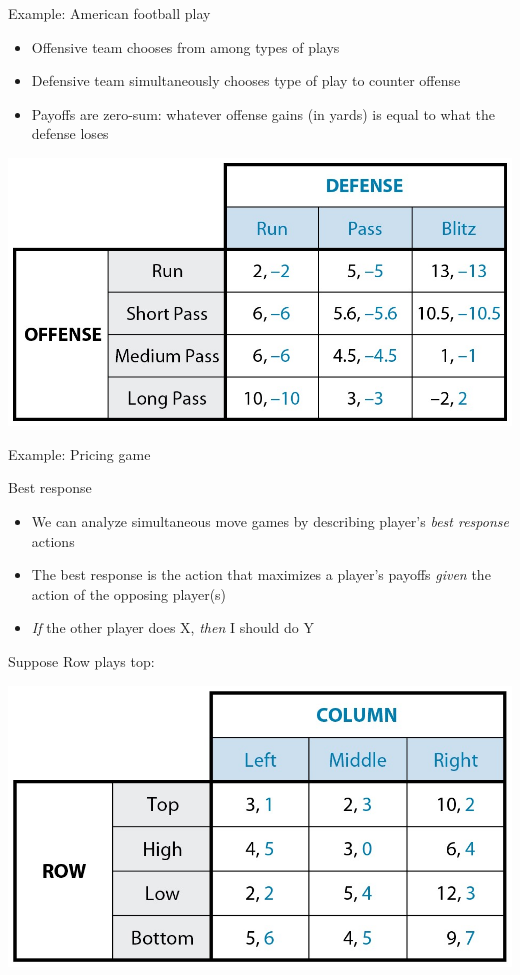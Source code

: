 \documentclass[10pt]{beamer}
\begin{document}
\begin{frame}[label={sec:orga65aae8}]{}
\alert{Example: American football play}
\begin{itemize}
\item Offensive team chooses from among types of plays
\item Defensive team simultaneously chooses type of play to counter offense
\item Payoffs are zero-sum: whatever offense gains (in yards) is equal to what the defense loses
\end{itemize}
\end{frame}

\begin{frame}[label={sec:orgaaaef25}]{}
\begin{center}
\includegraphics[width=.75\textwidth]{./img/GAMES4_FIG04.02.jpg}
\end{center}
\end{frame}

\begin{frame}[label={sec:orge548e35}]{Example: Pricing game}
\end{frame}

\begin{frame}[label={sec:org92d2af1}]{}
\alert{Best response}
\begin{itemize}
\item We can analyze simultaneous move games by describing player's \emph{best response} actions
\item The best response is the action that maximizes a player's payoffs \emph{given} the action of the opposing player(s)
\item \emph{If} the other player does X, \emph{then} I should do Y
\end{itemize}
\end{frame}

\begin{frame}[label={sec:org024ba13}]{Suppose Row plays top:}
\begin{center}
\includegraphics[width=.75\textwidth]{./img/GAMES4_FIG04.01.jpg}
\end{center}
\end{frame}
\end{document}
